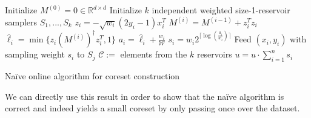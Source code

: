 \begin{algorithm}
    \DontPrintSemicolon
    Initialize $M^{(0)} = 0 \in \mathbb{R}^{d \times d}$ \;
    Initialize $k$ independent weighted size-1-reservoir
    samplers $S_1, ..., S_k$ \;
     {
        $z_i = -\sqrt{w_i} (2y_i - 1)x_i^T$
        $M^{(i)} = M^{(i-1)} + z_i^T z_i$
        $\hat{\ell}_i = \min\{z_i (M^{(i)})^\dagger z_i^T, 1\}$
        $a_i = \hat{\ell}_i + \frac{w_i}{\mathcal{W}}$
        $s_i = w_i 2^{\lceil\log(\frac{a_i}{w_i})\rceil}$
         {
            Feed $(x_i, y_i)$ with sampling weight $s_i$ to $S_j$ \;
        }
    }
    $\mathcal{C} := $ elements from the $k$ reservoirs \;
    $u = u \cdot \sum_{i=1}^n s_i$
    \caption{Na\"ive online algorithm for coreset construction\label{algo:online-naive}}
\end{algorithm}

We can directly use this result in order to show that the na\"ive
algorithm is correct and indeed yields a small coreset by
only passing once over the dataset.

